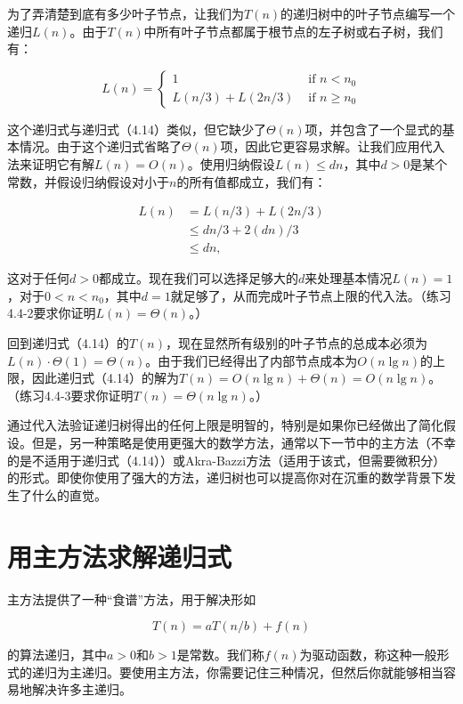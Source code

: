 \documentclass[lang=cn,newtx,10pt,scheme=chinese]{elegantbook}
\begin{document}
为了弄清楚到底有多少叶子节点，让我们为$T(n)$的递归树中的叶子节点编写一个递归$L(n)$。由于$T(n)$中所有叶子节点都属于根节点的左子树或右子树，我们有：

\begin{equation}
L(n)= \begin{cases}1 & \text { if } n<n_0 \\ L(n / 3)+L(2 n / 3) & \text { if } n \geq n_0\end{cases}
\end{equation}

这个递归式与递归式（4.14）类似，但它缺少了$\Theta(n)$项，并包含了一个显式的基本情况。由于这个递归式省略了$\Theta(n)$项，因此它更容易求解。让我们应用代入法来证明它有解$L(n)=O(n)$。使用归纳假设$L(n) \leq d n$，其中$d>0$是某个常数，并假设归纳假设对小于$n$的所有值都成立，我们有：

$$
\begin{aligned}
L(n) & =L(n / 3)+L(2 n / 3) \\
& \leq d n / 3+2(d n) / 3 \\
& \leq d n,
\end{aligned}
$$

这对于任何$d>0$都成立。现在我们可以选择足够大的$d$来处理基本情况$L(n)=1$，对于$0<n<n_0$，其中$d=1$就足够了，从而完成叶子节点上限的代入法。（练习4.4-2要求你证明$L(n)=\Theta(n)$。）

回到递归式（4.14）的$T(n)$，现在显然所有级别的叶子节点的总成本必须为$L(n) \cdot \Theta(1)=\Theta(n)$。由于我们已经得出了内部节点成本为$O(n \lg n)$的上限，因此递归式（4.14）的解为$T(n)=O(n \lg n)+\Theta(n)=O(n \lg n)$。（练习4.4-3要求你证明$T(n)=\Theta(n \lg n)$。）

通过代入法验证递归树得出的任何上限是明智的，特别是如果你已经做出了简化假设。但是，另一种策略是使用更强大的数学方法，通常以下一节中的主方法（不幸的是不适用于递归式（4.14））或Akra-Bazzi方法（适用于该式，但需要微积分）的形式。即使你使用了强大的方法，递归树也可以提高你对在沉重的数学背景下发生了什么的直觉。

\section{用主方法求解递归式}\label{section-4.5}

主方法提供了一种“食谱”方法，用于解决形如

\begin{equation}
T(n)=aT(n/b)+f(n)
\end{equation}

的算法递归，其中$a>0$和$b>1$是常数。我们称$f(n)$为驱动函数，称这种一般形式的递归为主递归。要使用主方法，你需要记住三种情况，但然后你就能够相当容易地解决许多主递归。
\end{document}
